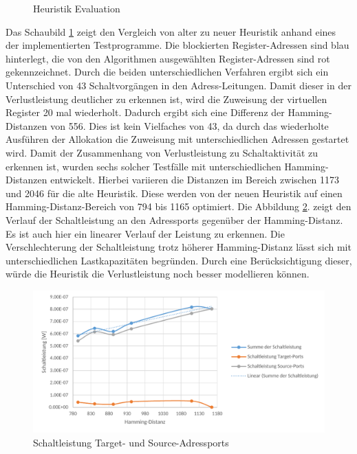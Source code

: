 \begin{figure}[H] 
	\centering
	
	\caption{Heuristik Evaluation}
	\label{fig:heuristik_eval}
\end{figure}
Das Schaubild \ref{fig:heuristik_eval} zeigt den Vergleich von alter zu neuer Heuristik anhand eines der implementierten Testprogramme. Die blockierten Register-Adressen sind blau hinterlegt, die von den Algorithmen ausgewählten Register-Adressen sind rot gekennzeichnet. Durch die beiden unterschiedlichen Verfahren ergibt sich ein Unterschied von 43 Schaltvorgängen in den Adress-Leitungen. Damit dieser in der Verlustleistung deutlicher zu erkennen ist, wird die Zuweisung der virtuellen Register 20 mal wiederholt. Dadurch ergibt sich eine Differenz der Hamming-Distanzen von 556. Dies ist kein Vielfaches von 43, da durch das wiederholte Ausführen der Allokation die Zuweisung mit unterschiedlichen Adressen gestartet wird.
Damit der Zusammenhang von Verlustleistung zu Schaltaktivität zu erkennen ist, wurden sechs solcher Testfälle mit unterschiedlichen Hamming-Distanzen entwickelt. Hierbei variieren die Distanzen im Bereich zwischen 1173 und 2046 für die alte Heuristik. Diese werden von der neuen Heuristik auf einen Hamming-Distanz-Bereich von 794 bis 1165 optimiert.
Die Abbildung \ref{fig:schaltleistung_heuristic}. zeigt den Verlauf der Schaltleistung an den Adressports gegenüber der Hamming-Distanz. Es ist auch hier ein linearer Verlauf der Leistung zu erkennen. Die Verschlechterung der Schaltleistung trotz höherer Hamming-Distanz lässt sich mit unterschiedlichen Lastkapazitäten begründen. Durch eine Berücksichtigung dieser, würde die Heuristik die Verlustleistung noch besser modellieren können. 
\begin{figure}[H]
	\centering
	\includegraphics[width=\textwidth]{fig/schaltleistung_heuristic.pdf}
	\caption{Schaltleistung Target- und Source-Adressports}
	\label{fig:schaltleistung_heuristic}
\end{figure}


